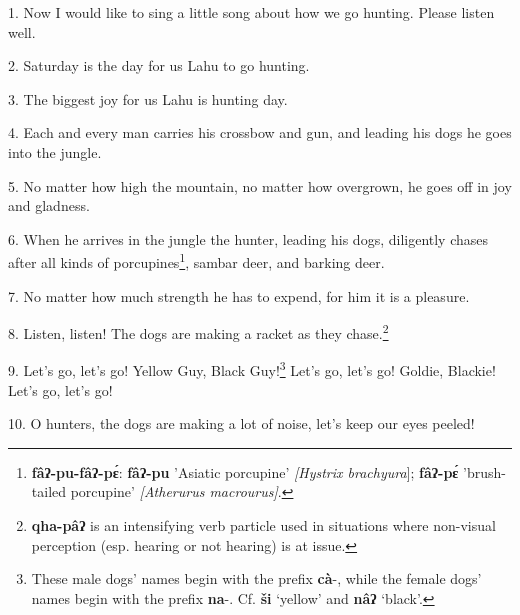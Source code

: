 \setcounter{footnote}{0}

1. Now I would like to sing a little song about how we go hunting. Please listen
well.

2. Saturday is the day for us Lahu to go hunting.

3. The biggest joy for us Lahu is hunting day.

4. Each and every man carries his crossbow and gun, and leading his dogs he goes
into the jungle.

5. No matter how high the mountain, no matter how overgrown, he goes off in joy
and gladness.

6. When he arrives in the jungle the hunter, leading his dogs, diligently chases
after all kinds of porcupines\footnote{\textbf{fâʔ-pu-fâʔ-pɛ́}: \textbf{fâʔ-pu} 'Asiatic porcupine'\textit{ [Hystrix brachyura}]; \textbf{fâʔ-pɛ́} 'brush-tailed porcupine' \textit{[Atherurus macrourus]}.}, sambar deer, and barking deer.

7. No matter how much strength he has to expend, for him it is a pleasure.

8. Listen, listen! The dogs are making a racket as they chase.\footnote{\textbf{qha-pâʔ} is an intensifying verb particle used in situations where non-visual perception (esp. hearing or not hearing) is at issue.}

9. Let's go, let's go! Yellow Guy, Black Guy!\footnote{These male dogs' names begin with the prefix \textbf{cà}-, while the female dogs' names begin with the prefix \textbf{na}-. Cf. \textbf{ši} `yellow' and \textbf{nâʔ} `black'.} Let's go, let's go! Goldie, Blackie!
Let's go, let's go!

10. O hunters, the dogs are making a lot of noise, let's keep our eyes peeled!

